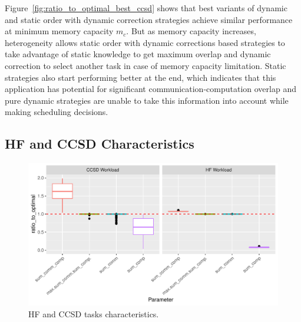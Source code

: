 \documentclass[sigconf]{acmart}
\begin{document}
{		Figure~\ref{fig:ratio_to_optimal_best_ccsd} shows that best variants of dynamic and static order with dynamic correction strategies achieve similar performance at minimum memory capacity $m_c$. But as memory capacity increases, heterogeneity allows static order with dynamic corrections based strategies to take advantage of static knowledge to get maximum overlap and dynamic correction to select another task in case of memory capacity limitation. Static strategies also start performing better at the end, which indicates that this application has potential for significant communication-computation overlap and pure dynamic strategies are unable to take this information into account while making scheduling decisions.
		
		\subsection{HF and CCSD Characteristics}
		

		\begin{figure}[htb]
		\includegraphics[scale=0.5]{./results/plots/application_properties.pdf}
	\caption{HF and CCSD tasks characteristics.}
	\label{fig:ApplicationProperties}
	\end{figure}	
		
}
\end{document}
